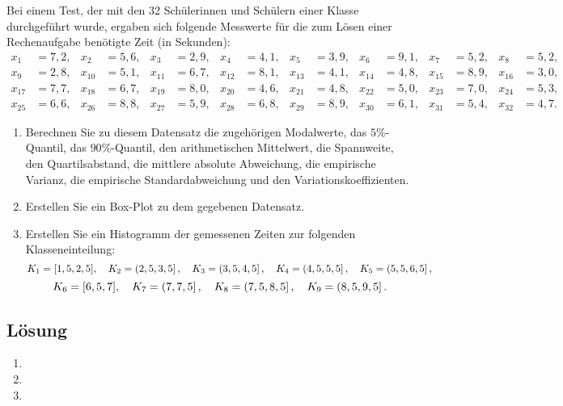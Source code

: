 \documentclass{exercise}
\begin{document}
    \begin{problem}
        Bei einem Test, der mit den 32 Schülerinnen und Schülern einer Klasse durchgeführt wurde, ergaben sich folgende Messwerte für die zum Lösen einer Rechenaufgabe benötigte Zeit (in Sekunden):
        \begin{align*}
            x_1 &= 7,2, & x_2 &= 5,6, & x_3 &= 2,9, & x_4 &= 4,1, & x_5 &= 3,9, & x_6 &= 9,1, & x_7 &= 5,2, & x_8 &= 5,2,\\
            x_9 &= 2,8, & x_{10} &= 5,1, & x_{11} &= 6,7, & x_{12} &= 8,1, & x_{13} &= 4,1, & x_{14} &= 4,8, & x_{15} &= 8,9, & x_{16} &= 3,0,\\
            x_{17} &= 7,7, & x_{18} &= 6,7, & x_{19} &= 8,0, & x_{20} &= 4,6, & x_{21} &= 4,8, & x_{22} &= 5,0, & x_{23} &= 7,0, & x_{24} &= 5,3,\\
            x_{25} &= 6,6, & x_{26} &= 8,8, & x_{27} &= 5,9, & x_{28} &= 6,8, & x_{29} &= 8,9, & x_{30} &= 6,1, & x_{31} &= 5,4, & x_{32} &= 4,7.
        \end{align*}
        \begin{enumerate}
            \item Berechnen Sie zu diesem Datensatz die zugehörigen Modalwerte, das \(5\%\)-Quantil, das \(90\%\)-Quantil, den arithmetischen Mittelwert, die Spannweite, den Quartilsabstand, die mittlere absolute Abweichung, die empirische Varianz, die empirische Standardabweichung und den Variationskoeffizienten.
            \item Erstellen Sie ein Box-Plot zu dem gegebenen Datensatz.
            \item Erstellen Sie ein Histogramm der gemessenen Zeiten zur folgenden Klasseneinteilung:
            \[
                K_1 = \brackets*{1,5, 2,5}, \quad K_2 = \left(2,5, 3,5\right], \quad K_3 = \left(3,5, 4,5\right], \quad K_4 = \left(4,5, 5,5\right], \quad K_5 = \left(5,5, 6,5\right],
            \]
            \[
                K_6 = \brackets*{6,5, 7}, \quad K_7 = \left(7, 7,5\right], \quad K_8 = \left(7,5, 8,5\right], \quad K_9 = \left(8,5, 9,5\right].
            \]
        \end{enumerate}
    \end{problem}

    \subsection*{Lösung}
    \begin{enumerate}
        \item
        \item
        \item 
    \end{enumerate}
\end{document}
